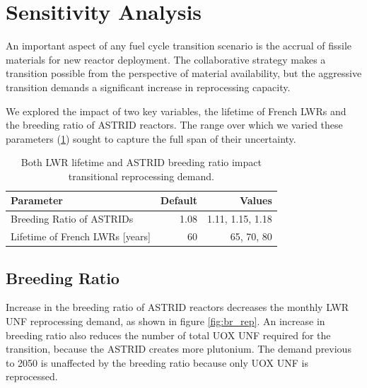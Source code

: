 \section{Sensitivity Analysis}

An important aspect of any fuel cycle transition scenario
is the accrual of fissile materials for new reactor deployment.
The collaborative strategy makes a transition possible 
from the perspective of material availability,
but the aggressive transition demands a significant increase in reprocessing capacity.

We explored the impact of two key variables, the lifetime of French \glspl{LWR} and the
breeding ratio of \gls{ASTRID} reactors. The range over which we varied these parameters (\cref{tab:sen_par})
sought to capture the full span of their uncertainty.

\begin{table}[h]
    \centering
    \caption{Both \gls{LWR} lifetime and \gls{ASTRID} breeding ratio impact 
    transitional reprocessing demand.}
    \begin{tabularx}{\textwidth}{lrr}
        \hline
        \textbf{Parameter} & \textbf{Default} & \textbf{Values} \\
        \hline
        Breeding Ratio of \glspl{ASTRID} & 1.08 & 1.11, 1.15, 1.18 \\ 
        Lifetime of French \glspl{LWR} [years] & 60  & 65, 70, 80 \\
        \hline
    \end{tabularx}
    \label{tab:sen_par}
\end{table}

\subsection{Breeding Ratio}

Increase in the breeding ratio of \gls{ASTRID} reactors
decreases the monthly \gls{LWR} \gls{UNF} reprocessing demand, as shown in 
figure \ref{fig:br_rep}. 
An increase in breeding ratio also reduces the number of total \gls{UOX} \gls{UNF}
required for the transition, because the \gls{ASTRID} creates more plutonium.
The demand previous to 2050 is unaffected by the 
breeding ratio because only \gls{UOX} \gls{UNF} is reprocessed. 

